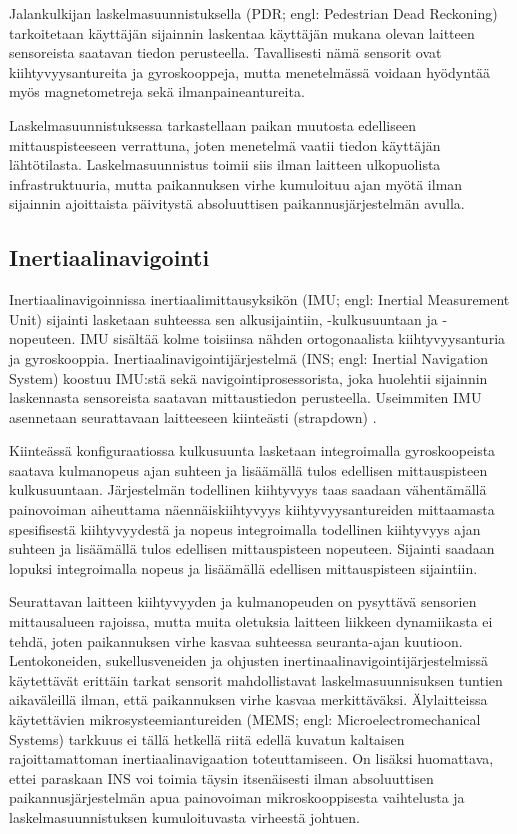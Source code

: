 Jalankulkijan laskelmasuunnistuksella (PDR; engl: Pedestrian Dead Reckoning)
tarkoitetaan käyttäjän sijainnin laskentaa käyttäjän mukana olevan laitteen
sensoreista saatavan tiedon perusteella. Tavallisesti nämä sensorit ovat
kiihtyvyysantureita ja gyroskooppeja, mutta menetelmässä voidaan hyödyntää myös
magnetometreja sekä ilmanpaineantureita.

Laskelmasuunnistuksessa tarkastellaan paikan muutosta edelliseen
mittauspisteeseen verrattuna, joten menetelmä vaatii tiedon käyttäjän
lähtötilasta. Laskelmasuunnistus toimii siis ilman laitteen ulkopuolista
infrastruktuuria, mutta paikannuksen virhe kumuloituu ajan myötä ilman
sijainnin ajoittaista päivitystä absoluuttisen paikannusjärjestelmän
avulla.

\subsection{Inertiaalinavigointi}

Inertiaalinavigoinnissa inertiaalimittausyksikön (IMU; engl: Inertial
Measurement Unit) sijainti lasketaan suhteessa sen alkusijaintiin,
-kulkusuuntaan ja -nopeuteen. IMU sisältää kolme toisiinsa nähden
ortogonaalista kiihtyvyysanturia ja gyroskooppia.
Inertiaalinavigointijärjestelmä (INS; engl: Inertial Navigation System) koostuu
IMU:stä sekä navigointiprosessorista, joka huolehtii sijainnin laskennasta
sensoreista saatavan mittaustiedon perusteella. Useimmiten IMU asennetaan
seurattavaan laitteeseen kiinteästi (strapdown) \cite{harle2013}.

Kiinteässä konfiguraatiossa kulkusuunta lasketaan
integroimalla gyroskoopeista saatava kulmanopeus ajan suhteen ja lisäämällä
tulos edellisen mittauspisteen kulkusuuntaan. Järjestelmän todellinen
kiihtyvyys taas saadaan vähentämällä painovoiman aiheuttama näennäiskiihtyvyys
kiihtyvyysantureiden mittaamasta spesifisestä kiihtyvyydestä ja nopeus
integroimalla todellinen kiihtyvyys ajan suhteen ja lisäämällä tulos edellisen
mittauspisteen nopeuteen. Sijainti saadaan lopuksi integroimalla nopeus ja
lisäämällä edellisen mittauspisteen sijaintiin.

Seurattavan laitteen kiihtyvyyden ja kulmanopeuden on pysyttävä sensorien
mittausalueen rajoissa, mutta muita oletuksia laitteen liikkeen dynamiikasta ei
tehdä, joten paikannuksen virhe kasvaa suhteessa seuranta-ajan kuutioon.
Lentokoneiden, sukellusveneiden ja ohjusten inertinaalinavigointijärjestelmissä
käytettävät erittäin tarkat sensorit mahdollistavat laskelmasuunnisuksen
tuntien aikaväleillä ilman, että paikannuksen virhe kasvaa merkittäväksi.
Älylaitteissa käytettävien mikrosysteemiantureiden (MEMS; engl:
Microelectromechanical Systems) tarkkuus ei tällä hetkellä riitä edellä kuvatun
kaltaisen rajoittamattoman inertiaalinavigaation toteuttamiseen. On lisäksi
huomattava, ettei paraskaan INS voi toimia täysin itsenäisesti ilman
absoluuttisen paikannusjärjestelmän apua painovoiman mikroskooppisesta
vaihtelusta ja laskelmasuunnistuksen kumuloituvasta virheestä johtuen.


